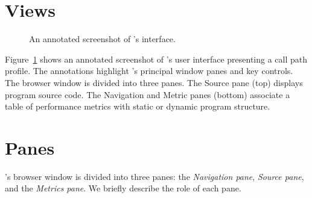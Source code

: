 
\section{Views}

\begin{figure}[t]
\caption{An annotated screenshot of \hpctraceviewer{}'s interface.}
\label{fig:hpctraceviewer-legend}
\end{figure}

Figure~\ref{fig:hpctraceviewer-legend} shows an annotated screenshot of \hpctraceviewer{}'s user interface presenting a call path profile.
The annotations highlight \hpctraceviewer{}'s principal window panes and key controls.
The browser window is divided into three panes.
The Source pane (top) displays program source code.
The Navigation and Metric panes (bottom) associate a table of performance metrics with static or dynamic program structure.



\section{Panes}
\label{sec:hpcviewer:panes}

\hpcviewer{}'s browser window is divided into three panes: the \emph{Navigation pane}, \emph{Source pane}, and the \emph{Metrics pane}.
We briefly describe the role of each pane.

